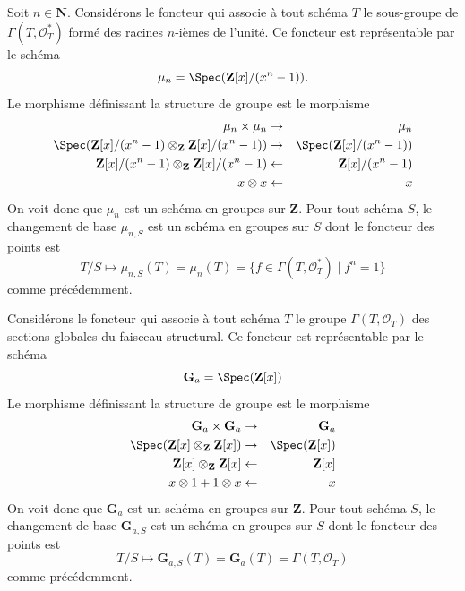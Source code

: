\begin{example}
\label{example-roots-of-unity}
Soit $n \in \mathbf{N}$.
Considérons le foncteur qui associe
à tout schéma $T$ le sous-groupe de $\Gamma(T, \mathcal{O}_T^*)$
formé des racines $n$-ièmes de l'unité.
Ce foncteur est représentable par le schéma
$$
\mu_n = \Spec(\mathbf{Z}[x]/(x^n - 1)).
$$
Le morphisme définissant la structure de groupe est le morphisme
\begin{eqnarray*}
\mu_n \times \mu_n & \to & \mu_n \\
\Spec(
\mathbf{Z}[x]/(x^n - 1)
\otimes_{\mathbf{Z}}
\mathbf{Z}[x]/(x^n - 1))
& \to &
\Spec(\mathbf{Z}[x]/(x^n - 1)) \\
\mathbf{Z}[x]/(x^n - 1) \otimes_{\mathbf{Z}} \mathbf{Z}[x]/(x^n - 1)
& \leftarrow &
\mathbf{Z}[x]/(x^n - 1) \\
x \otimes x & \leftarrow & x
\end{eqnarray*}
On voit donc que $\mu_n$ est un schéma en groupes sur $\mathbf{Z}$.
Pour tout schéma $S$, le changement de base $\mu_{n, S}$ est un
schéma en groupes sur $S$ dont le foncteur des points est
$$
T/S
\longmapsto
\mu_{n, S}(T) = \mu_n(T) = \{f \in \Gamma(T, \mathcal{O}_T^*) \mid f^n = 1\}
$$
comme précédemment.
\end{example}


\begin{example}
\label{example-additive-group}
Considérons le foncteur qui associe
à tout schéma $T$ le groupe $\Gamma(T, \mathcal{O}_T)$
des sections globales du faisceau structural.
Ce foncteur est représentable par le schéma
$$
\mathbf{G}_a = \Spec(\mathbf{Z}[x])
$$
Le morphisme définissant la structure de groupe est le morphisme
\begin{eqnarray*}
\mathbf{G}_a \times \mathbf{G}_a & \to & \mathbf{G}_a \\
\Spec(\mathbf{Z}[x] \otimes_{\mathbf{Z}} \mathbf{Z}[x])
& \to &
\Spec(\mathbf{Z}[x]) \\
\mathbf{Z}[x] \otimes_{\mathbf{Z}} \mathbf{Z}[x]
& \leftarrow &
\mathbf{Z}[x] \\
x \otimes 1 + 1 \otimes x & \leftarrow & x
\end{eqnarray*}
On voit donc que $\mathbf{G}_a$ est un schéma en groupes sur $\mathbf{Z}$.
Pour tout schéma $S$, le changement de base $\mathbf{G}_{a, S}$ est un
schéma en groupes sur $S$ dont le foncteur des points est
$$
T/S
\longmapsto
\mathbf{G}_{a, S}(T) = \mathbf{G}_a(T) = \Gamma(T, \mathcal{O}_T)
$$
comme précédemment.
\end{example}

